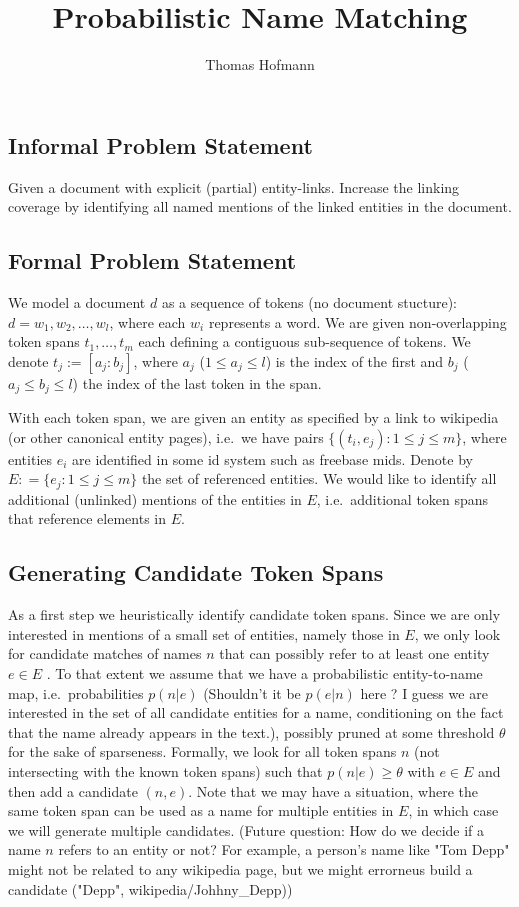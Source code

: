 \documentclass{article}
\title{Probabilistic Name Matching}
\author{Thomas Hofmann}
\begin{document}
\maketitle

\subsection*{Informal Problem Statement}
Given a document with explicit (partial) entity-links. Increase the linking coverage by identifying all named mentions of the linked entities in the document. 

\subsection*{Formal Problem Statement}

We model a document $d$ as a sequence of tokens (no document stucture): $d = w_1,w_2,\dots,w_l$, where each $w_i$ represents a word. We are given non-overlapping token spans $t_1,\dots,t_m$ each defining a contiguous sub-sequence  of tokens.  We denote $t_j := [a_j:b_j]$, where $a_j$ ($1 \leq a_j \leq l$) is the index of the first and $b_j$ ($a_j \leq b_j \leq l$) the index of the last token in the span. 

With each token span, we are given an entity as specified by a link to wikipedia (or other canonical entity pages), i.e.~we have pairs $\{(t_i,e_j): 1 \leq j \leq m \}$, where entities $e_i$ are identified in some id system such as freebase mids. Denote by $E: = \{ e_j: 1 \leq j \leq m\}$ the set of referenced entities. We would like to identify all additional (unlinked) mentions of the entities in $E$, i.e.~additional token spans that reference elements in $E$. 

\subsection*{Generating Candidate Token Spans} 

As a first step we heuristically identify candidate token spans. Since we are only interested in mentions of a small set of entities, namely those in $E$, we only look for candidate matches of names $n$ that can possibly refer to at least one entity $e \in E$
. To that extent we assume that we have a  probabilistic entity-to-name map, i.e.~probabilities $p(n|e)$ {\color{blue} (Shouldn't it be $p(e|n)$ here ? I guess we are interested in the set of all candidate entities for a name, conditioning on the fact that the name already appears in the text.)}, possibly pruned at some threshold $\theta$ for the sake of sparseness. Formally, we look for all token spans $n$ (not intersecting with the known token spans) such that $p(n|e) \geq \theta$  with $e \in E$ and then add a candidate $(n,e)$. Note that we may have a situation, where the same token span can be used as a name for multiple entities in $E$, in which case we will generate multiple candidates. {\color{blue} (Future question: How do we decide if a name $n$ refers to an entity or not? For example, a person's name like "Tom Depp" might not be related to any wikipedia page, but we might errorneus build a candidate ("Depp", wikipedia/Johhny\_Depp))}
\end{document}
